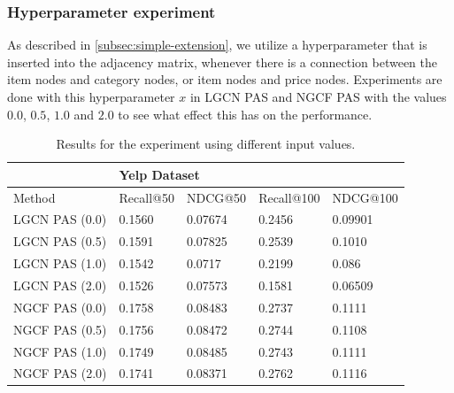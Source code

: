 \subsubsection{Hyperparameter experiment}
As described in \autoref{subsec:simple-extension}, we utilize a hyperparameter that is inserted into the adjacency matrix, whenever there is a connection between the item nodes and category nodes, or item nodes and price nodes.
Experiments are done with this hyperparameter $x$ in LGCN PAS and NGCF PAS with the values $0.0$, $0.5$, $1.0$ and $2.0$ to see what effect this has on the performance.
\begin{table}[h!]
    \centering
    \begin{tabular}{|l|l|l|l|l|}
        \hline
        \rowcolor[HTML]{FFFFFF}
                       & \multicolumn{4}{l|}{\cellcolor[HTML]{FFFFFF}Yelp Dataset}                                   \\ \hline
        Method         & Recall@50                                                 & NDCG@50 & Recall@100 & NDCG@100 \\ \hline
        LGCN PAS (0.0) & 0.1560                                                    & 0.07674 & 0.2456     & 0.09901  \\ \hline
        LGCN PAS (0.5) & 0.1591                                                    & 0.07825 & 0.2539     & 0.1010   \\ \hline
        LGCN PAS (1.0) & 0.1542                                                    & 0.0717  & 0.2199     & 0.086    \\ \hline
        LGCN PAS (2.0) & 0.1526                                                    & 0.07573 & 0.1581     & 0.06509  \\ \hline
        NGCF PAS (0.0) & 0.1758                                                    & 0.08483 & 0.2737     & 0.1111   \\ \hline
        NGCF PAS (0.5) & 0.1756                                                    & 0.08472 & 0.2744     & 0.1108   \\ \hline
        NGCF PAS (1.0) & 0.1749                                                    & 0.08485 & 0.2743     & 0.1111   \\ \hline
        NGCF PAS (2.0) & 0.1741                                                    & 0.08371 & 0.2762     & 0.1116   \\ \hline
    \end{tabular}
    \caption{Results for the experiment using different input values.}
    \label{tab:hyperparameter-results}
\end{table}
